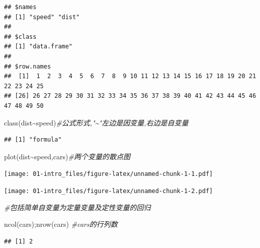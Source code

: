 \documentclass[
]{book}
\newenvironment{Shaded}{\begin{snugshade}}{\end{snugshade}}
\newcommand{\CommentTok}[1]{\textcolor[rgb]{0.56,0.35,0.01}{\textit{#1}}}
\newcommand{\FunctionTok}[1]{\textcolor[rgb]{0.00,0.00,0.00}{#1}}
\newcommand{\NormalTok}[1]{#1}
\newcommand{\SpecialCharTok}[1]{\textcolor[rgb]{0.00,0.00,0.00}{#1}}
\begin{document}
\begin{verbatim}
## $names
## [1] "speed" "dist" 
## 
## $class
## [1] "data.frame"
## 
## $row.names
##  [1]  1  2  3  4  5  6  7  8  9 10 11 12 13 14 15 16 17 18 19 20 21 22 23 24 25
## [26] 26 27 28 29 30 31 32 33 34 35 36 37 38 39 40 41 42 43 44 45 46 47 48 49 50
\end{verbatim}

\begin{Shaded}
\begin{Highlighting}[]
\FunctionTok{class}\NormalTok{(dist}\SpecialCharTok{\textasciitilde{}}\NormalTok{speed)}\CommentTok{\#公式形式,"\textasciitilde{}"左边是因变量,右边是自变量}
\end{Highlighting}
\end{Shaded}

\begin{verbatim}
## [1] "formula"
\end{verbatim}

\begin{Shaded}
\begin{Highlighting}[]
\FunctionTok{plot}\NormalTok{(dist}\SpecialCharTok{\textasciitilde{}}\NormalTok{speed,cars)}\CommentTok{\#两个变量的散点图}
\end{Highlighting}
\end{Shaded}

\texttt{[image: 01-intro\_files/figure-latex/unnamed-chunk-1-1.pdf]}

\begin{Shaded}
\end{Shaded}

\texttt{[image: 01-intro\_files/figure-latex/unnamed-chunk-1-2.pdf]}

\begin{Shaded}
\begin{Highlighting}[]
\CommentTok{\#包括简单自变量为定量变量及定性变量的回归}

\FunctionTok{ncol}\NormalTok{(cars);}\FunctionTok{nrow}\NormalTok{(cars) }\CommentTok{\#cars的行列数}
\end{Highlighting}
\end{Shaded}

\begin{verbatim}
## [1] 2
\end{verbatim}
\end{document}
